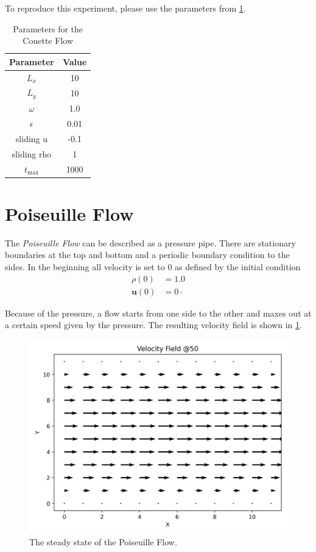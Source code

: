 To reproduce this experiment, please use the parameters from \cref{tab:cf-parameters}.

\begin{table}[ht]
    \centering %
    \begin{tabular}{c c}
        \hline\hline %
        Parameter   & Value \\ [0.5ex] %
        \hline %
        $L_x$       & 10    \\
        $L_y$       & 10    \\
        $\omega$    & 1.0   \\
        $\epsilon$  & 0.01  \\
        sliding u   & -0.1  \\
        sliding rho & 1     \\
        $t_{\max}$  & 1000  \\ [1ex] %
        \hline %
    \end{tabular}
    \caption{Parameters for the Couette Flow} %
    \label{tab:cf-parameters}
\end{table}


\section{Poiseuille Flow}
The \textit{Poiseuille Flow} can be described as a pressure pipe.
There are stationary boundaries at the top and bottom and a periodic boundary condition to the sides.
In the beginning all velocity is set to 0 as defined by the initial condition
\begin{equation*}
    \begin{aligned}
        \rho(0) &= 1.0 \\
        \mathbf{u}(0) &= 0 \cdot
    \end{aligned}
\end{equation*}

Because of the pressure, a flow starts from one side to the other and maxes out at a certain speed given by the pressure.
The resulting velocity field is shown in \cref{fig:pf-velocity-field}.
\begin{figure}[h!]
    \begin{center}
        \includegraphics[width=0.5\linewidth]{graphs/PoiseuilleFlow/velocity_field_50}
        \caption{The steady state of the Poiseuille Flow.}
        \label{fig:pf-velocity-field}
    \end{center}
\end{figure}

